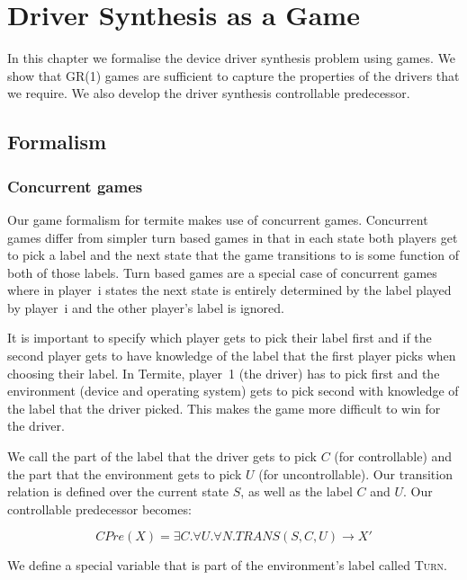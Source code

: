 \chapter{Driver Synthesis as a Game}

In this chapter we formalise the device driver synthesis problem using games. We show that GR(1) games are sufficient to capture the properties of the drivers that we require. We also develop the driver synthesis controllable predecessor.

\section{Formalism}


\subsection{Concurrent games}

Our game formalism for termite makes use of concurrent games. Concurrent games differ from simpler turn based games in that in each state both players get to pick a label and the next state that the game transitions to is some function of both of those labels. Turn based games are a special case of concurrent games where in player~i states the next state is entirely determined by the label played by player~i and the other player's label is ignored. 

It is important to specify which player gets to pick their label first and if the second player gets to have knowledge of the label that the first player picks when choosing their label. In Termite, player~1 (the driver) has to pick first and the environment (device and operating system) gets to pick second with knowledge of the label that the driver picked. This makes the game more difficult to win for the driver.

We call the part of the label that the driver gets to pick $C$ (for controllable) and the part that the environment gets to pick $U$ (for uncontrollable). Our transition relation is defined over the current state $S$, as well as the label $C$ and $U$. Our controllable predecessor becomes:

\begin{equation}
    CPre(X) = \exists C. \forall U. \forall N. TRANS(S, C, U) \rightarrow X'
\end{equation}

We define a special variable that is part of the environment's label called \textsc{Turn}.

